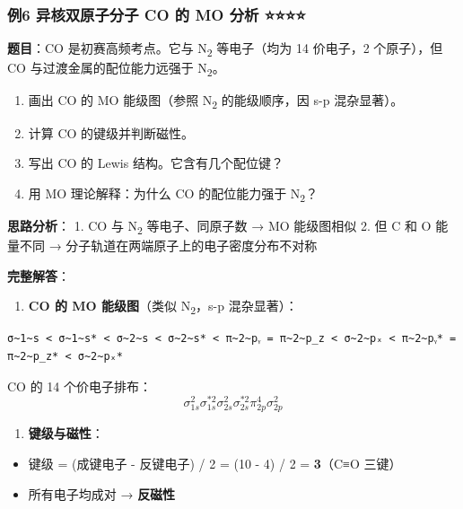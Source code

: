 \documentclass[a4paper,11pt]{ctexart}
\providecommand{\tightlist}{\setlength{\itemsep}{0pt}\setlength{\parskip}{0pt}}
\begin{document}
\subsubsection{例6 异核双原子分子 CO 的 MO 分析 ⭐⭐⭐⭐}\label{ux4f8b6-ux5f02ux6838ux53ccux539fux5b50ux5206ux5b50-co-ux7684-mo-ux5206ux6790}

\textbf{题目}：CO 是初赛高频考点。它与 N\textsubscript{2} 等电子（均为 14 价电子，2 个原子），但 CO 与过渡金属的配位能力远强于 N\textsubscript{2}。

\begin{enumerate}
\def\labelenumi{(\arabic{enumi})}
\tightlist
\item
  画出 CO 的 MO 能级图（参照 N\textsubscript{2} 的能级顺序，因 s-p 混杂显著）。
\item
  计算 CO 的键级并判断磁性。
\item
  写出 CO 的 Lewis 结构。它含有几个配位键？
\item
  用 MO 理论解释：为什么 CO 的配位能力强于 N\textsubscript{2}？
\end{enumerate}

\textbf{思路分析}：
1. CO 与 N\textsubscript{2} 等电子、同原子数 → MO 能级图相似
2. 但 C 和 O 能量不同 → 分子轨道在两端原子上的电子密度分布不对称

\textbf{完整解答}：

\begin{enumerate}
\def\labelenumi{(\arabic{enumi})}
\tightlist
\item
  \textbf{CO 的 MO 能级图}（类似 N\textsubscript{2}，s-p 混杂显著）：
\end{enumerate}

\begin{verbatim}
σ~1~s < σ~1~s* < σ~2~s < σ~2~s* < π~2~pᵧ = π~2~p_z < σ~2~pₓ < π~2~pᵧ* = π~2~p_z* < σ~2~pₓ*
\end{verbatim}

CO 的 14 个价电子排布：
\[
\sigma_{1s}^2 \sigma_{1s}^{*2} \sigma_{2s}^2 \sigma_{2s}^{*2} \pi_{2p}^4 \sigma_{2p}^2
\]

\begin{enumerate}
\def\labelenumi{(\arabic{enumi})}
\setcounter{enumi}{1}
\tightlist
\item
  \textbf{键级与磁性}：
\end{enumerate}

\begin{itemize}
\tightlist
\item
  键级 = (成键电子 - 反键电子) / 2 = (10 - 4) / 2 = \textbf{3}（C≡O 三键）
\item
  所有电子均成对 → \textbf{反磁性}
\end{itemize}
\end{document}

